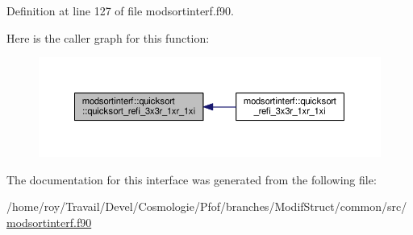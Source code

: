 Definition at line 127 of file modsortinterf.\-f90.



Here is the caller graph for this function\-:\nopagebreak
\begin{figure}[H]
\begin{center}
\leavevmode
\includegraphics[width=350pt]{interfacemodsortinterf_1_1quicksort_a237ac7aee8dc5e42d744ff43931172c7_icgraph}
\end{center}
\end{figure}




The documentation for this interface was generated from the following file\-:\begin{DoxyCompactItemize}
\item 
/home/roy/\-Travail/\-Devel/\-Cosmologie/\-Pfof/branches/\-Modif\-Struct/common/src/\hyperlink{modsortinterf_8f90}{modsortinterf.\-f90}\end{DoxyCompactItemize}
